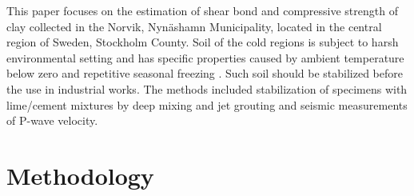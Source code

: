 \documentclass[USenglish,twocolumn]{article}
\begin{document}
This paper focuses on the estimation of shear bond and compressive strength of clay collected in the Norvik, Nynäshamn Municipality, located in the central region of Sweden, Stockholm County. Soil of the cold regions is subject to harsh environmental setting and has specific properties caused by ambient temperature below zero and repetitive seasonal freezing \cite{LindhWinter,Lemenkov2021b,Lemenkov2021a,Sato}. Such soil should be stabilized before the use in industrial works. The methods included stabilization of specimens with lime/cement mixtures by deep mixing and jet grouting and seismic measurements of P-wave velocity. 


\section{Methodology}
\end{document}
